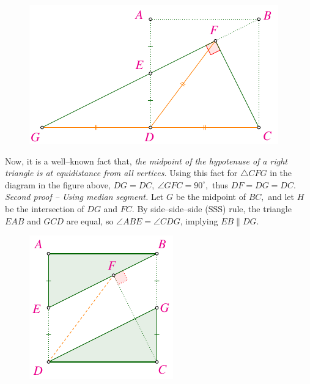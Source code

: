 \begin{multicols}{2}
\begin{figure}[H]
		\vspace*{-15pt}
	\end{figure}
	\begin{figure}[H]
		\vspace*{-5pt}
		\centering
		\captionsetup{labelformat= empty, justification=centering}
		\includegraphics[width= 0.9\linewidth]{2022-2-ms-1-1-b.pdf}
		\vspace*{-10pt}
	\end{figure}	
	Now, it is a well--known fact that,
	\textit{the midpoint of the hypotenuse of a right triangle is at equidistance from all vertices.}
	Using this fact for $\triangle CFG$ in the diagram in the figure above, $DG=DC,\ \angle{GFC} = 90^\circ,$ thus $DF=DG=DC.$
	\vskip 0.1cm
	\textit{Second proof -- Using median segment.}
	Let $G$ be the midpoint of $BC,$ and let $H$ be the intersection of $DG$ and $FC$.
	By side--side--side (SSS) rule, the triangle $ EAB$ and $  GCD$ are equal,
	so $\angle ABE = \angle CDG$, implying $EB \parallel DG.$
	\begin{figure}[H]
		\vspace*{-15pt}
		\centering
		\captionsetup{labelformat= empty, justification=centering}
		\includegraphics[width= 0.65\linewidth]{2022-2-ms-1-1-c.pdf}

\end{figure}
\end{multicols}
